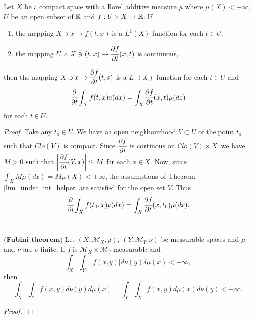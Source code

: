 \documentclass[main.tex]{subfiles}
\begin{document}
\begin{theorem}
\label{lim_under_int}
Let $X$ be a compact space with a Borel additive measure $\mu$ where $\mu(X) < +\infty$, $U$ be an open subset of $\mathbb{R}$ and $f:U\times X\to\mathbb{R}$. If
\begin{enumerate}
\item
the mapping $X\ni x \to f(t, x)$ is a $L^1(X)$ function for each $t\in U$,
\item
the mapping $U\times X \ni (t, x) \to \cfrac{\partial f}{\partial t}(x, t)$ is continuous,
\end{enumerate}
then
the mapping $X\ni x \to \cfrac{\partial f}{\partial t}(t, x)$ is a $L^1(X)$ function for each $t\in U$ and
\begin{equation}
\cfrac{\partial }{\partial t}\int_X f(t, x) \mu(dx) = \int_X \cfrac{\partial f}{\partial t}(x, t) \mu(dx)  
\end{equation}
for each $t\in U$.

\end{theorem}
\begin{proof}
Take any $t_0\in U$. We have an open neighbourhood $V\subset U$ of the point $t_0$ such that $Clo(V)$ is compact. Since $\cfrac{\partial f}{\partial t}$ is continous on $Clo(V)\times X$, we have $M > 0$ such that $\bigg\rvert\cfrac{\partial f}{\partial t}(V, x)\bigg\lvert \leq M$ for each $x\in X$. Now, since $\int_X M \mu(dx) = M\mu(X) < +\infty$, the assumptions of Theorem \ref{lim_under_int_helper} are satisfied for the open set $V$. Thus
\begin{equation}
\cfrac{\partial }{\partial t}\int_X f(t_0, x) \mu(dx) = \int_X \cfrac{\partial f}{\partial t}(x, t_0) \mu(dx).  
\end{equation}
\end{proof}
\begin{theorem} (\textbf{Fubini theorem})
\label{fubini-theorem}
Let $(X, \mathcal{M}_X, \mu)$, $(Y, \mathcal{M}_Y, \nu)$ be measurable spaces and $\mu$ and $\nu$ are $\sigma$-finite. If $f$ is $\mathcal{M}_X\times\mathcal{M}_Y$ measurable and 
\begin{equation}
\int_X \int_Y |f(x,y)|d\nu(y) d\mu(x) < +\infty,
\end{equation}
then 
\begin{equation}
\int_X \int_Y f(x,y)d\nu(y) d\mu(x) = \int_Y \int_X f(x,y)d\mu(x) d\nu(y) < +\infty.
\end{equation}
\end{theorem}
\begin{proof}
\cite[See][Integration on Product Spaces. The Fubini theorem]{rudin1987}
\end{proof}
\end{document}
